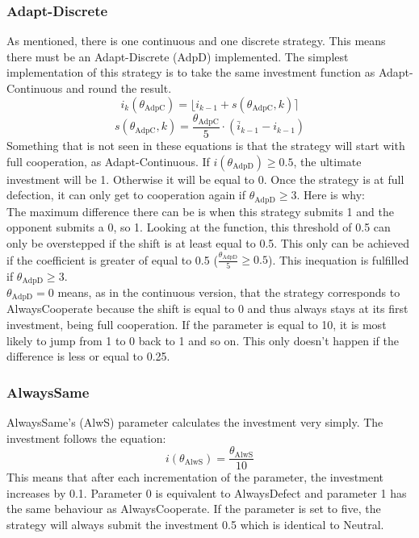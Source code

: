 \documentclass[11pt]{article}
\newcommand{\round}[1]{\ensuremath{\lfloor#1\rceil}}
\begin{document}
\subsubsection*{Adapt-Discrete}
As mentioned, there is one continuous and one discrete strategy.
This means there must be an Adapt-Discrete (AdpD) implemented.
The simplest implementation of this strategy is to take the same investment function as Adapt-Continuous and round the result.
$$i_k(\theta_{\mathrm{AdpC}}) = \round{i_{k-1} + s(\theta_{\mathrm{AdpC}}, k)}$$
$$s(\theta_{\mathrm{AdpC}}, k) = \frac{\theta_{\mathrm{AdpC}}}{5} \cdot (\bar i_{k-1} - i_{k-1})$$
Something that is not seen in these equations is that the strategy will start with full cooperation, as Adapt-Continuous.
If $i(\theta_{\mathrm{AdpD}}) \ge 0.5$, the ultimate investment will be 1.
Otherwise it will be equal to 0.
Once the strategy is at full defection, it can only get to cooperation again if $\theta_{\mathrm{AdpD}} \ge 3$.
Here is why:\\
The maximum difference there can be is when this strategy submits 1 and the opponent submits a 0, so 1.
Looking at the function, this threshold of 0.5 can only be overstepped if the shift is at least equal to 0.5.
This only can be achieved if the coefficient is greater of equal to 0.5 ($\frac{\theta_{\mathrm{AdpD}}}{5} \ge 0.5$).
This inequation is fulfilled if $\theta_{\mathrm{AdpD}} \ge 3$.\\
$\theta_{\mathrm{AdpD}} = 0$ means, as in the continuous version, that the strategy corresponds to AlwaysCooperate because the shift is equal to 0 and thus always stays at its first investment, being full cooperation.
If the parameter is equal to 10, it is most likely to jump from 1 to 0 back to 1 and so on.
This only doesn't happen if the difference is less or equal to 0.25.\\

\subsubsection*{AlwaysSame}
AlwaysSame's (AlwS) parameter calculates the investment very simply.
The investment follows the equation: 
$$i(\theta_{\mathrm{AlwS}}) = \frac{\theta_{\mathrm{AlwS}}}{10}$$
This means that after each incrementation of the parameter, the investment increases by 0.1.
Parameter 0 is equivalent to AlwaysDefect and parameter 1 has the same behaviour as AlwaysCooperate.
If the parameter is set to five, the strategy will always submit the investment 0.5 which is identical to Neutral.\\
\end{document}
